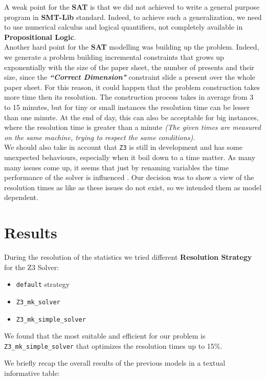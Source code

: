 A weak point for the \textbf{SAT} is that we did not achieved to write a general purpose program in \textbf{SMT-Lib} standard. Indeed, to achieve such a generalization, we need to use
numerical calculus and logical quantifiers, not completely available in \textbf{Propositional Logic}.\\

Another hard point for the \textbf{SAT} modelling was building up the problem. Indeed, we generate a problem building incremental constraints that grows up exponentially with the size of
the paper sheet, the number of presents and their size, since the \textbf{\textit{``Correct Dimension"}} constraint slide a present over the whole paper sheet. For this reason, it could happen
that the problem construction takes more time then its resolution. The construction process takes in average from 3 to 15 minutes, but for tiny or small instances the resolution time can be lesser
than one minute. At the end of day, this can also be acceptable for big instances, where the resolution time is greater than a minute
\textit{(The given times are measured on the same machine, trying to respect the same conditions)}.\\

We should also take in account that \texttt{Z3} is still in development and has some unexpected behaviours, especially when it boil down to a time matter.
As many many issues come up, it seems that just by renaming variables the time performance of the solver is influenced \cite{z3issues}.
Our decision was to show a view of the resolution times as like as these issues do not exist, so we intended them as model dependent.

\newpage
\section{Results}
During the resolution of the statistics we tried different \textbf{Resolution Strategy} for the Z3 Solver:
\begin{itemize}
	\item \texttt{default} strategy
	\item \texttt{Z3\_mk\_solver}
	\item \texttt{Z3\_mk\_simple\_solver}
\end{itemize}
We found that the most suitable and efficient for our problem is \texttt{Z3\_mk\_simple\_solver} that optimizes the resolution times up to 15\%.

We briefly recap the overall results of the previous models in a textual informative table:

